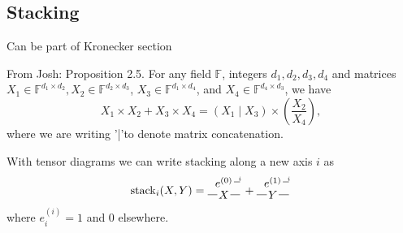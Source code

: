 \subsection{Stacking}
Can be part of Kronecker section

From Josh:
Proposition 2.5. For any field $\mathbb{F}$, integers $d_1, d_2, d_3, d_4$ and matrices $X_1 \in \mathbb{F}^{d_1 \times d_2}, X_2 \in \mathbb{F}^{d_2 \times d_3}$, $X_3 \in \mathbb{F}^{d_1 \times d_4}$, and $X_4 \in \mathbb{F}^{d_4 \times d_3}$, we have
$$
X_1 \times X_2+X_3 \times X_4=\left(X_1 \mid X_3\right) \times\left(\frac{X_2}{X_4}\right),
$$
where we are writing '|'to denote matrix concatenation.

With tensor diagrams we can write stacking along a new axis $i$ as
\[
\mathrm{stack}_i(X, Y)
=
\begin{tikzpicture}[baseline=-.5em, inner sep = 1pt]
    \node (e) at (0, .2) {$e^{(0)}$};
    \draw (e) -- ++(.5,0) node[midway, above right, font=\tiny] {$i$};
    \node (X) at (0, -.2) {$X$};
    \draw (X) -- ++(.5,0);
    \draw (X) -- ++(-.5,0);
\end{tikzpicture}
+
\begin{tikzpicture}[baseline=-.5em, inner sep = 1pt]
    \node (e) at (0, .2) {$e^{(1)}$};
    \draw (e) -- ++(.5,0) node[midway, above right, font=\tiny] {$i$};
    \node (X) at (0, -.2) {$Y$};
    \draw (X) -- ++(.5,0);
    \draw (X) -- ++(-.5,0);
\end{tikzpicture}
\]
where $e^{(i)}_i=1$ and 0 elsewhere.

